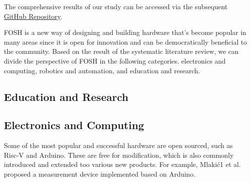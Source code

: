 \documentclass[final-report.tex]{subfiles}
\begin{document}
The comprehensive results of our study can be accessed via the subsequent 
\href{https://github.com/aliraeisdanaei/FOSH_Lit_Review}{GitHub Repository}.

FOSH is a new way of designing and building hardware that's become popular in many areas since it is open for innovation and can be democratically beneficial to the community. Based on the result of the systematic literature review, we can divide the perspective of FOSH in the following categories. electronics and computing, robotics and automation, and education and research.
\subsection{Education and Research}



\subsection{Electronics and Computing}
Some of the most popular and successful hardware are open sourced, such as Risc-V and Arduino. 
These are free for modification, which is also commonly introduced and extended too various new products. 
For example, Mlakić1 et al. proposed a measurement device implemented based on Arduino. 
\end{document}
